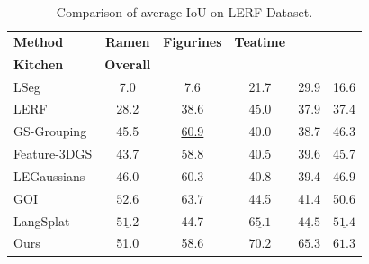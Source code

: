 \begin{table}[t]
    \centering
    \footnotesize
    \begin{tabular}{lccccc}
        \toprule
        \textbf{Method}& 
        \hspace{-2pt}\textbf{Ramen}\hspace{-2pt} & \hspace{-2pt}\textbf{Figurines}\hspace{-2pt} & \hspace{-2pt}\textbf{Teatime}\hspace{-2pt} & \hspace{-2pt}\makecell{\textbf{Waldo}\\\textbf{Kitchen}}\hspace{-2pt} & \hspace{-2pt}\textbf{Overall}\hspace{-2pt} \\
        \midrule
        LSeg & 7.0 & 7.6 & 21.7 & 29.9 & 16.6 \\
        LERF & 28.2 & 38.6 & 45.0 & 37.9 & 37.4 \\
        GS-Grouping & 45.5 & \underline{60.9} & 40.0 & 38.7 & 46.3 \\
        Feature-3DGS & 43.7 & 58.8 & 40.5 & 39.6 & 45.7 \\
        LEGaussians & 46.0 & 60.3 & 40.8 & 39.4 & 46.9 \\
        GOI & $\mathbf{52.6}$ & $\mathbf{63.7}$ & 44.5 & 41.4 & 50.6 \\
        LangSplat & $\underline{51.2}$ & 44.7 & $\underline{65.1}$ & $\underline{44.5}$ & $\underline{51.4}$ \\
        Ours & 51.0 & 58.6 & $\mathbf{70.2}$ & $\mathbf{65.3}$ & $\mathbf{61.3}$ \\
        \bottomrule
    \end{tabular}
    \caption{Comparison of average IoU on LERF Dataset.}
    \label{tab:lerf-mIoU}
\end{table}